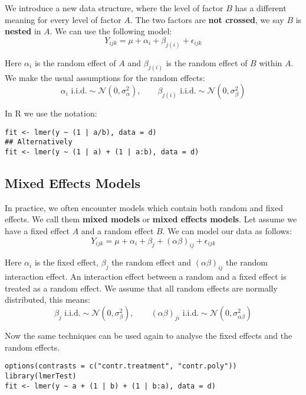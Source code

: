 We introduce a new data structure, where the level of factor $B$ has a different meaning for every level of factor $A$. The two factors are \textbf{not crossed}, we say $B$ is \textbf{nested} in $A$. We can use the following model:
$$Y_{ijk} = \mu + \alpha_i + \beta_{j(i)} + \epsilon_{ijk}$$

Here $\alpha_i$ is the random effect of $A$ and $\beta_{j(i)}$ is the random effect of $B$ within $A$. We make the usual assumptions for the random effects:
$$\alpha_i \text{ i.i.d.} \sim \mathcal{N}(0, \sigma_\alpha^2), \qquad \beta_{j(i)} \text{ i.i.d.} \sim \mathcal{N}(0, \sigma_\beta^2)$$

In R we use the notation:
\begin{lstlisting}
fit <- lmer(y ~ (1 | a/b), data = d)
## Alternatively
fit <- lmer(y ~ (1 | a) + (1 | a:b), data = d)
\end{lstlisting}

\subsection{Mixed Effects Models}

In practice, we often encounter models which contain both random and fixed effects. We call them \textbf{mixed models} or \textbf{mixed effects models}. Let assume we have a fixed effect $A$ and a random effect $B$. We can model our data as follows:
$$Y_{ijk} = \mu + \alpha_i + \beta_j + (\alpha \beta)_{ij} + \epsilon_{ijk}$$

Here $\alpha_i$ is the fixed effect, $\beta_j$ the random effect and $(\alpha \beta)_{ij}$ the random interaction effect. An interaction effect between a random and a fixed effect is treated as a random effect. We assume that all random effects are normally distributed, this means:
$$\beta_j \text{ i.i.d.} \sim \mathcal{N}(0, \sigma_\beta^2), \qquad (\alpha\beta)_{ji} \text{ i.i.d.} \sim \mathcal{N}(0, \sigma_{\alpha\beta}^2)$$

Now the same techniques can be used again to analyse the fixed effects and the random effects.
\begin{lstlisting}
options(contrasts = c("contr.treatment", "contr.poly"))
library(lmerTest)
fit <- lmer(y ~ a + (1 | b) + (1 | b:a), data = d)
\end{lstlisting}

